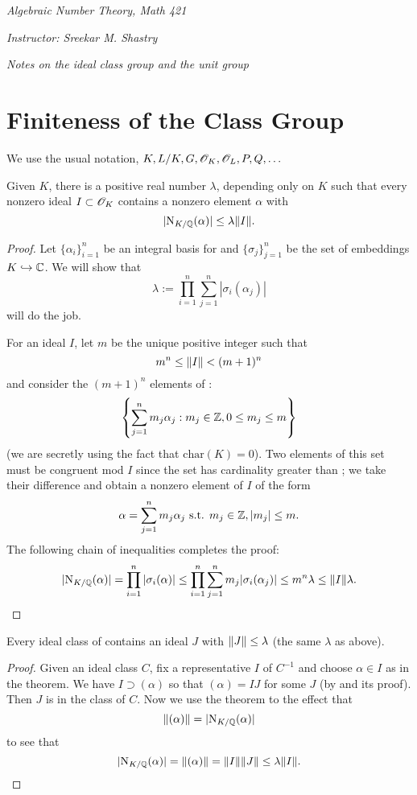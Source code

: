 \documentclass[10pt,a4paper,reqno]{amsart}
\begin{document}


\noindent \textit{Algebraic Number Theory, Math 421}

\noindent \textit{Instructor: Sreekar M. Shastry}

\noindent \textit{Notes on the ideal class group and the unit group}

\section{Finiteness of the Class Group}

We use the usual notation, $K, L/K, G, \mathscr{O}_K, \mathscr{O}_L, P, Q, \dots$

\begin{thm}
Given $K$, there is a positive real number $\lambda$, depending only on $K$
such that every nonzero ideal $I\subset \mathscr{O}_K$ contains a nonzero element
$\alpha$ with \[|\mathrm{N}_{K/\mathbb{Q}}(\alpha)| \le \lambda \| I\|.\]
\end{thm}
\begin{proof}
Let \(\{\alpha_i\}_{i=1}^n\) be an integral basis for \OK{} and
$\{\sigma_j\}_{j=1}^n$ be the set of embeddings $K\hookrightarrow \mathbb{C}$. We will
show that \[\lambda := \prod_{i=1}^n \sum_{j=1}^n |\sigma_i(\alpha_j)|\] will
do the job.

For an ideal $I$, let $m$ be the unique positive integer such that \[m^n \le
\| I\| < (m+1)^n\] and consider the $(m+1)^n$ elements of \OK:
\[\left\{\sum_{j=1}^n m_j\alpha_j : m_j \in \mathbb{Z}, 0 \le m_j \le m \right\}\] (we
are secretly using the fact that $\mathrm{char}(K)=0$). Two elements of this
set must be congruent mod $I$ since the set has cardinality greater than
; we take their difference and obtain a nonzero element of $I$ of the
form \[\alpha = \sum_{j=1}^n m_j\alpha_j \text{ s.t. } m_j\in\mathbb{Z}, |m_j| \le m.\]
The following chain of inequalities completes the proof: \[|\mathrm{N}_{K/\mathbb{Q}}(\alpha)|
= \prod_{i=1}^n |\sigma_i(\alpha)| \le \prod_{i=1}^n \sum_{j=1}^n
m_j|\sigma_i(\alpha_j)| \le m^n\lambda \le \| I\|\lambda.\]
\end{proof}

\begin{cor}
Every ideal class of \OK{} contains an ideal $J$ with $\| J\| \le \lambda$
(the same $\lambda$ as above).
\end{cor}
\begin{proof}
Given an ideal class $C$, fix a representative $I$ of $C^{-1}$ and choose
$\alpha\in I$ as in the theorem. We have $I\supset (\alpha)$ so that $(\alpha)
= IJ$ for some $J$ (by \cite[Theorem 15,p.57]{M} and its proof). Then $J$ is in
the class of $C$. Now we use the theorem to the effect that \[\| (\alpha)\| =
|\mathrm{N}_{K/\mathbb{Q}}(\alpha)|\] to see that \[| \mathrm{N}_{K/\mathbb{Q}}(\alpha) | = \| (\alpha)\| =
\| I\|\| J\| \le \lambda\| I\|. \]
\end{proof}
\end{document}
